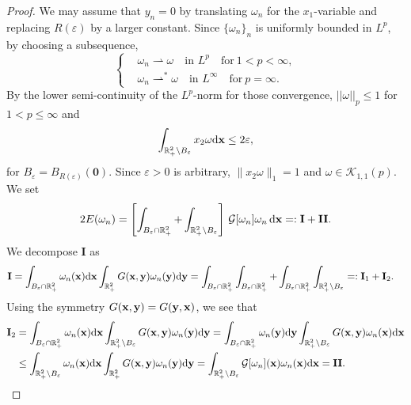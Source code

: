 \documentclass[11pt]{amsart}
\theoremstyle{definition}
\theoremstyle{definition}
\numberwithin{equation}{section}
\newcommand{\0}{\emptyset}
\newcommand{\omg}{\omega}
\newcommand{\bfx}{{\bf x}}
\newcommand{\bfy}{{\bf y}}
\newcommand{\bbR}{\mathbb R}
\newcommand{\calK}{\mathcal K}
\newcommand{\varep}{\varepsilon}
\newcommand{\dd}{\mathrm{d}}
\begin{document}
\begin{proof}
				We may assume that $y_{n}=0$ by translating $\omega_n$ for the $x_1$-variable and replacing $R(\varepsilon)$ by a larger constant. Since $\{\omega_n\}_{n}$ is uniformly bounded in $L^{p}$, by choosing a subsequence,
				\begin{equation*}
					\left\{
					\begin{aligned}
						&\omega_n  \rightharpoonup  \omega \quad \text{in } L^{p}\quad \textrm{for}\ 1<p<\infty, \\
						&\omg_{n} \rightharpoonup^* \omg \quad \text{in } L^{\infty}\quad \textrm{for}\ p=\infty.
					\end{aligned}
					\right.
				\end{equation*}
				By the lower semi-continuity of the $L^{p}$-norm for those convergence, $||\omega||_{p}\leq 1$ for $1<p\leq \infty$ and 
				\begin{equation*}
					\label{impulse_limit}
					\int_{ \bbR^2_+ \setminus B_{\varep}} x_2  \omega   \dd \bfx  \le   2\varepsilon,
				\end{equation*}
				for $B_{\varep}=B_{R(\varepsilon)}(\mathbf{0})$. Since $\varepsilon > 0$ is arbitrary, $\|x_2 \omega\|_1=1$ and $\omega \in \calK_{1,1}(p)$. We set 
				\begin{align*}
					2E(\omega_n)  = \left[ \int_{B_{\varep} \cap \mathbb{R}^{2}_{+}} + \int_{\mathbb{R}^{2}_{+} \setminus B_{\varep}}\right] \,  \mathcal{G}[\omega_n] \omega_n \, \dd \bfx   =: \mathbf{I} + \mathbf{II}.
				\end{align*}
				We decompose $\mathbf{I}$ as
				\begin{align*}
					\mathbf{I}=    \int_{B_{\varep} \cap \mathbb{R}^{2}_{+}} \omega_n(\bfx) \dd \bfx \int_{\mathbb{R}^{2}_{+}} G(\bfx,\bfy) \omega_n(\bfy)  \dd \bfy 
					&=   \int_{B_{\varep} \cap \mathbb{R}^{2}_{+}} \int_{B_{\varep} \cap \mathbb{R}^{2}_{+}} + \int_{B_{\varep} \cap \mathbb{R}^{2}_{+}} \int_{\mathbb{R}^{2}_{+} \setminus B_{\varep}} =: \mathbf{I}_1 + \mathbf{I}_{2}.
				\end{align*}
				Using the symmetry $G(\bfx, \bfy) = G(\bfy, \bfx)$, we see that
				\begin{align*}
					\mathbf{I}_{2} &= \int_{B_{\varep} \cap \mathbb{R}^{2}_{+}} \omega_n(\bfx)  \dd \bfx \int_{\mathbb{R}^{2}_{+} \setminus B_{\varep}} G(\bfx,\bfy) \omega_n(\bfy)  \dd \bfy =  \int_{B_{\varep} \cap \mathbb{R}^{2}_{+}} \omega_n(\bfy)  \dd \bfy \int_{\mathbb{R}^{2}_{+} \setminus B_{\varep}} G(\bfx,\bfy) \omega_n(\bfx)  \dd \bfx \\
					&\leq  \int_{\mathbb{R}^{2}_{+} \setminus B_{\varep}} \omega_n(\bfx)  \dd \bfx \int_{ \mathbb{R}^{2}_{+}} G(\bfx,\bfy) \omega_n(\bfy)  \dd \bfy  =   \int_{\mathbb{R}^{2}_{+} \setminus B_{\varep}} \mathcal{G}[\omega_n](\bfx) \omega_n(\bfx)  \dd \bfx = \mathbf{II}.

\end{align*}
\end{proof}
\end{document}
